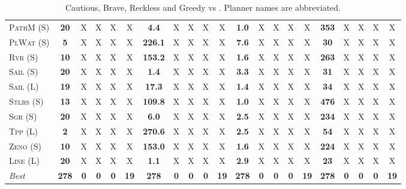 \begin{table}[tb]
{\begin{tabular}{|l||ccccc||ccccc||ccccc||ccccc||}
\textsc{PathM} (S)&\textbf{20}&X&X&X&X&\textbf{4.4}&X&X&X&X&\textbf{1.0}&X&X&X&X&\textbf{353}&X&X&X&X\\
\textsc{PlWat} (S)&\textbf{5}&X&X&X&X&\textbf{226.1}&X&X&X&X&\textbf{7.6}&X&X&X&X&\textbf{30}&X&X&X&X\\
\textsc{Rvr} (S)&\textbf{10}&X&X&X&X&\textbf{153.2}&X&X&X&X&\textbf{1.6}&X&X&X&X&\textbf{263}&X&X&X&X\\
\textsc{Sail} (S)&\textbf{20}&X&X&X&X&\textbf{1.4}&X&X&X&X&\textbf{3.3}&X&X&X&X&\textbf{31}&X&X&X&X\\
\textsc{Sail} (L)&\textbf{19}&X&X&X&X&\textbf{17.3}&X&X&X&X&\textbf{1.4}&X&X&X&X&\textbf{34}&X&X&X&X\\
\textsc{Stlrs} (S)&\textbf{13}&X&X&X&X&\textbf{109.8}&X&X&X&X&\textbf{1.0}&X&X&X&X&\textbf{476}&X&X&X&X\\
\textsc{Sgr} (S)&\textbf{20}&X&X&X&X&\textbf{6.0}&X&X&X&X&\textbf{2.5}&X&X&X&X&\textbf{234}&X&X&X&X\\
\textsc{Tpp} (L)&\textbf{2}&X&X&X&X&\textbf{270.6}&X&X&X&X&\textbf{2.5}&X&X&X&X&\textbf{54}&X&X&X&X\\
\textsc{Zeno} (S)&\textbf{10}&X&X&X&X&\textbf{153.0}&X&X&X&X&\textbf{1.6}&X&X&X&X&\textbf{224}&X&X&X&X\\
\textsc{Line} (L)&\textbf{20}&X&X&X&X&\textbf{1.1}&X&X&X&X&\textbf{2.9}&X&X&X&X&\textbf{23}&X&X&X&X
\\\hline
\textit{Best}&\textbf{278}&\textbf{0}&\textbf{0}&\textbf{0}&\textbf{19}&\textbf{278}&\textbf{0}&\textbf{0}&\textbf{0}&\textbf{19}&\textbf{278}&\textbf{0}&\textbf{0}&\textbf{0}&\textbf{19}&\textbf{278}&\textbf{0}&\textbf{0}&\textbf{0}&\textbf{19}\\\hline

        \end{tabular}}
        \caption{Cautious, Brave, Reckless and Greedy \pattyd vs \pattyo. Planner names are abbreviated.}
        \label{tab:cbrg}
        \end{table}
        